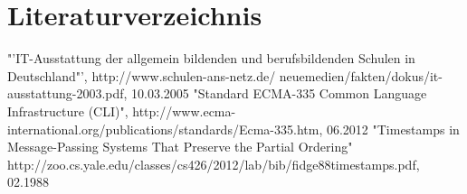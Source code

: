 \documentclass[10pt,a4paper]{article}
\begin{document}
\section{Literaturverzeichnis}
\renewcommand{\section}[2]{}%
\begin{thebibliography}{xxxxxxxxxxxxx}
"'IT-Ausstattung der allgemein bildenden und berufsbildenden 
                         Schulen in Deutschland"', http://www.schulen-ans-netz.de/   
                         neuemedien/fakten/dokus/it-ausstattung-2003.pdf, 10.03.2005	
"Standard ECMA-335 Common Language Infrastructure (CLI)", http://www.ecma-international.org/publications/standards/Ecma-335.htm, 06.2012
"Timestamps in Message-Passing Systems That Preserve the Partial Ordering" http://zoo.cs.yale.edu/classes/cs426/2012/lab/bib/fidge88timestamps.pdf, 02.1988
\end{thebibliography}
\end{document}
